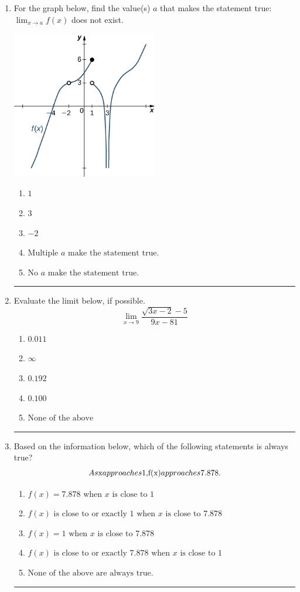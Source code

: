 \documentclass[14pt]{extbook}
\newcommand{\litem}[1]{\item#1\hspace*{-1cm}\rule{\textwidth}{0.4pt}}
\begin{document}
\begin{enumerate}
{\begin{enumerate}[label=\Alph*.]
\end{enumerate} }
\litem{
For the graph below, find the value(s) $a$ that makes the statement true: $ \displaystyle \lim_{x \rightarrow a} f(x)$ does not exist.
\begin{center}
    \includegraphics[width=0.5\textwidth]{../Figures/evaluateLimitGraphicallyA.png}
\end{center}
\begin{enumerate}[label=\Alph*.]
\item \( 1 \)
\item \( 3 \)
\item \( -2 \)
\item \( \text{Multiple } a \text{ make the statement true}. \)
\item \( \text{No } a \text{ make the statement true}. \)

\end{enumerate} }
\litem{
Evaluate the limit below, if possible.\[ \lim_{x \rightarrow 9} \frac{\sqrt{3x - 2} - 5}{9x - 81} \]\begin{enumerate}[label=\Alph*.]
\item \( 0.011 \)
\item \( \infty \)
\item \( 0.192 \)
\item \( 0.100 \)
\item \( \text{None of the above} \)

\end{enumerate} }
\litem{
Based on the information below, which of the following statements is always true?\[ As $x$ approaches $1$, $f(x)$ approaches $7.878$. \]\begin{enumerate}[label=\Alph*.]
\item \( f(x) = 7.878 \text{ when } x \text{ is close to } 1 \)
\item \( f(x) \text{ is close to or exactly } 1 \text{ when } x \text{ is close to } 7.878 \)
\item \( f(x) = 1 \text{ when } x \text{ is close to } 7.878 \)
\item \( f(x) \text{ is close to or exactly } 7.878 \text{ when } x \text{ is close to } 1 \)
\item \( \text{None of the above are always true.} \)

\end{enumerate} }
\end{enumerate}
\end{document}
